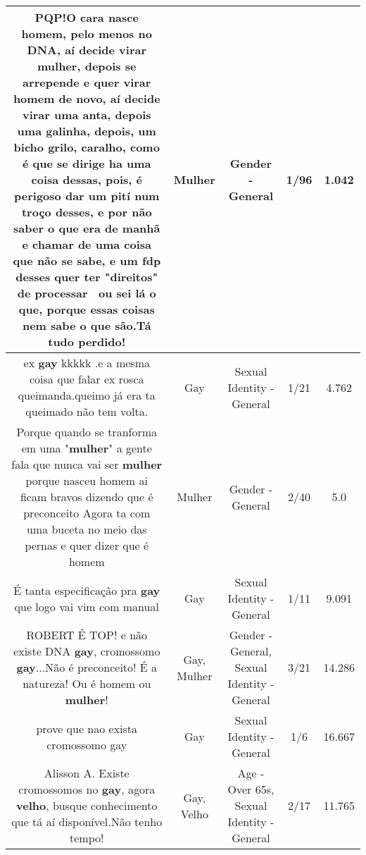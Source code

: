 \documentclass[11pt]{article}
\newlength\mylength
\begin{document}
\begin{center}
\begin{longtable}{|C{.65\mylength}|C{.30\mylength}|C{.12\mylength}|C{.12\mylength}|C{.12\mylength}|}
  \small PQP!O cara nasce homem, pelo menos no DNA, aí decide virar \textbf{mulher}, depois se arrepende e quer virar homem de novo, aí decide virar uma anta, depois uma galinha, depois, um bicho grilo, caralho, como é que se dirige ha uma coisa dessas, pois, é perigoso dar um pití num troço desses, e por não saber o que era de manhã e chamar de uma coisa que não se sabe, e um fdp desses quer ter "direitos" de processar~ ou sei lá o que, porque essas coisas nem sabe o que são.Tá tudo perdido!\normalsize   & Mulher & Gender - General & 1/96 & 1.042 \\  \hline
  \small ex \textbf{gay} kkkkk .e a mesma coisa que falar ex rosca queimanda.queimo já era ta queimado não tem volta.\normalsize   & Gay & Sexual Identity - General & 1/21 & 4.762 \\  \hline
  \small Porque quando se tranforma em uma "\textbf{mulher}" a gente fala que nunca vai ser \textbf{mulher} porque nasceu homem ai ficam bravos dizendo que é preconceito Agora ta com uma buceta no meio das pernas e quer dizer que é homem\normalsize   & Mulher & Gender - General & 2/40 & 5.0 \\  \hline
  \small É tanta especificação pra \textbf{gay} que logo vai vim com manual\normalsize   & Gay & Sexual Identity - General & 1/11 & 9.091 \\  \hline
  \small ROBERT É TOP! e não existe DNA \textbf{gay}, cromossomo \textbf{gay}...Não é preconceito! É a natureza! Ou é homem ou \textbf{mulher}!\normalsize   & Gay, Mulher & Gender - General, Sexual Identity - General & 3/21 & 14.286 \\  \hline
  \small prove que nao exista cromossomo gay\normalsize   & Gay & Sexual Identity - General & 1/6 & 16.667 \\  \hline
  \small Alisson A. Existe cromossomos no \textbf{gay}, agora \textbf{velho}, busque conhecimento que tá aí disponível.Não tenho tempo!\normalsize   & Gay, Velho & Age - Over 65s, Sexual Identity - General & 2/17 & 11.765 \\  \hline

\end{longtable}
\end{center}
\end{document}
